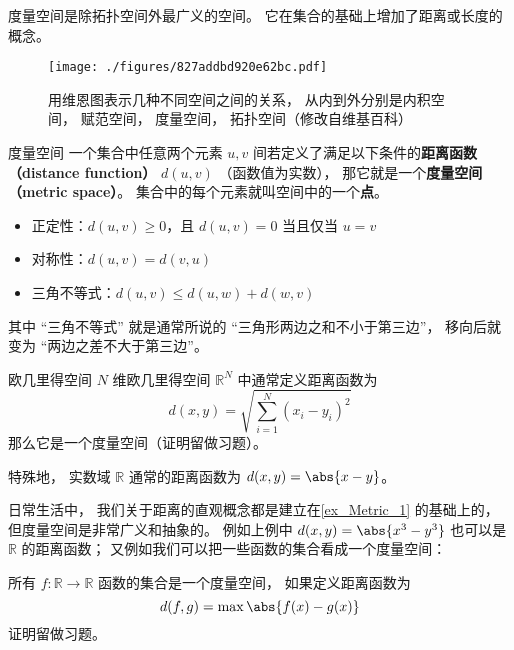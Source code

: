 

度量空间是除拓扑空间外最广义的空间。 它在集合的基础上增加了距离或长度的概念。
\begin{figure}[ht]
\centering
\texttt{[image: ./figures/827addbd920e62bc.pdf]}
\caption{用维恩图表示几种不同空间之间的关系， 从内到外分别是内积空间， 赋范空间， 度量空间， 拓扑空间（修改自维基百科）} \label{fig_Metric_2}
\end{figure}

\begin{definition}{度量空间}\label{def_Metric_2}
一个集合中任意两个元素 $u, v$ 间若定义了满足以下条件的\textbf{距离函数（distance function）} $d(u, v)$ （函数值为实数）， 那它就是一个\textbf{度量空间（metric space）}。 集合中的每个元素就叫空间中的一个\textbf{点}。
\begin{itemize}
\item 正定性：$d(u, v) \geq 0$，且 $d(u, v)=0$ 当且仅当 $u=v$
\item 对称性：$d(u, v) = d(v, u)$
\item 三角不等式：$d(u, v) \leqslant d(u, w) + d(w, v)$
\end{itemize}
\end{definition}
其中 “三角不等式” 就是通常所说的 “三角形两边之和不小于第三边”， 移向后就变为 “两边之差不大于第三边”。

\begin{example}{欧几里得空间}\label{ex_Metric_1}
$N$ 维欧几里得空间 $\mathbb R^N$ 中通常定义距离函数为
\begin{equation}\label{eq_Metric_1}
d(x, y) = \sqrt{\sum_{i=1}^N (x_i - y_i)^2}
\end{equation}
那么它是一个度量空间（证明留做习题）。

特殊地， 实数域 $\mathbb R$ 通常的距离函数为 $d(x, y) = \abs{x - y}$。
\end{example}

日常生活中， 我们关于距离的直观概念都是建立在\autoref{ex_Metric_1} 的基础上的， 但度量空间是非常广义和抽象的。 例如上例中 $d(x, y) = \abs{x^3 - y^3}$ 也可以是 $\mathbb R$ 的距离函数； 又例如我们可以把一些函数的集合看成一个度量空间：
\begin{example}{}\label{ex_Metric_2}
所有 $f:\mathbb R \to \mathbb R$ 函数的集合是一个度量空间， 如果定义距离函数为
\begin{equation}
d(f, g) = \max{\abs{f(x) - g(x)}}
\end{equation}
证明留做习题。
\end{example}

